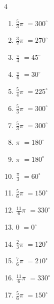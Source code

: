 \begin{multicols}{4}
\begin{enumerate}
  \item $\displaystyle \frac{5}{3}\pi$
        $\displaystyle =300^{\circ}$

  \item $\displaystyle \frac{3}{2}\pi$
        $\displaystyle =270^{\circ}$

  \item $\displaystyle \frac{\pi}{4}$
        $\displaystyle =45^{\circ}$

  \item $\displaystyle \frac{\pi}{6}$
        $\displaystyle =30^{\circ}$

  \item $\displaystyle \frac{5}{4}\pi$
        $\displaystyle =225^{\circ}$

  \item $\displaystyle \frac{5}{3}\pi$
        $\displaystyle =300^{\circ}$

  \item $\displaystyle \frac{5}{3}\pi$
        $\displaystyle =300^{\circ}$

  \item $\displaystyle \pi$
        $\displaystyle =180^{\circ}$

  \item $\displaystyle \pi$
        $\displaystyle =180^{\circ}$

  \item $\displaystyle \frac{\pi}{3}$
        $\displaystyle =60^{\circ}$

  \item $\displaystyle \frac{5}{6}\pi$
        $\displaystyle =150^{\circ}$

  \item $\displaystyle \frac{11}{6}\pi$
        $\displaystyle =330^{\circ}$

  \item $\displaystyle 0$
        $\displaystyle =0^{\circ}$

  \item $\displaystyle \frac{2}{3}\pi$
        $\displaystyle =120^{\circ}$

  \item $\displaystyle \frac{7}{6}\pi$
        $\displaystyle =210^{\circ}$

  \item $\displaystyle \frac{11}{6}\pi$
        $\displaystyle =330^{\circ}$

  \item $\displaystyle \frac{5}{6}\pi$
        $\displaystyle =150^{\circ}$


\end{enumerate}
\end{multicols}
